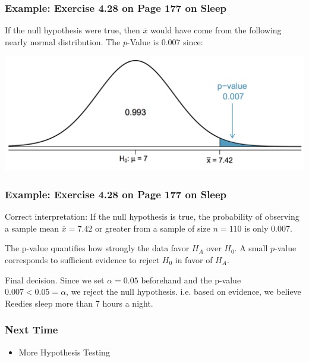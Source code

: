 \documentclass[handout]{beamer}
\newcommand{\blue}[1]{\textcolor{blue2}{#1}}
\newcommand{\xbar}{\overline{x}}
\begin{document}
\begin{frame}
\frametitle{Example:  Exercise 4.28 on Page 177 on Sleep}

If the null hypothesis were true, then $\xbar$ would have come from the following nearly normal distribution.  The $p$-Value is 0.007 since:

\begin{center}
\includegraphics[width=\textwidth]{figure/pvalue.png}
\end{center}

\end{frame}


\begin{frame}
\frametitle{Example:  Exercise 4.28 on Page 177 on Sleep}

\blue{Correct interpretation}:  If the null hypothesis is true, the probability of observing a sample mean $\xbar=7.42$ or greater from a sample of size $n=110$ is only 0.007.  

\pause \vspace{0.5cm}
The p-value quantifies how strongly the data favor $H_A$ over $H_0$.  A small $p$-value corresponds to sufficient evidence to reject $H_0$ in favor of $H_A$.  


\pause \vspace{0.5cm}
Final decision.  Since we set $\alpha=0.05$ \blue{beforehand} and the p-value $0.007 < 0.05 = \alpha$, we reject the null hypothesis.  i.e. based on evidence, we believe Reedies sleep more than 7 hours a night.  

\end{frame}

\begin{frame}[fragile]
\frametitle{Next Time}

\begin{itemize}
\item More Hypothesis Testing
\end{itemize}

\end{frame}
\end{document}

